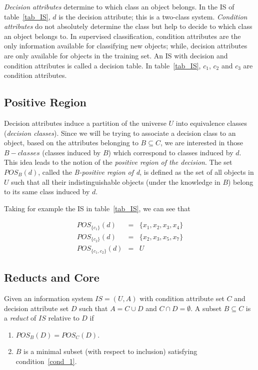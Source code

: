 \documentclass[citenumber]{llncs}
\begin{document}
   
  \textit{Decision attributes} determine to which class an object belongs. In the IS of
  table~\ref{tab_IS}, $d$ is the decision attribute; this is a two-class system. \textit{Condition attributes} 
  do not absolutely determine the class but help to decide to which class an object belongs to. In supervised 
  classification, condition attributes are the only information available for classifying new objects; while, 
  decision attributes are only available for objects in the training set. An IS with decision and 
  condition attributes is called a decision table. In table~\ref{tab_IS}, $c_1$, $c_2$ and $c_3$ are condition 
  attributes.
  
\subsection{Positive Region}\label{subsect_Pos}
  Decision attributes induce a partition of the universe $U$ into equivalence classes 
  (\textit{decision classes}). Since we will be trying to associate a decision class to an object, 
  based on the attributes belonging to $B \subseteq C$, we are interested in those 
  $B-classes$ (classes induced by $B$) which correspond to classes induced by $d$. 
  This idea leads to the notion of the  \textit{positive region of the decision}. The set $POS_B(d)$, 
  called the \textit{B-positive region of d}, is defined as the set of all objects in $U$ such 
  that all their indistinguishable objects (under the knowledge in $B$) belong to its same class induced 
  by $d$.
  
  Taking for example the IS in table~\ref{tab_IS}, we can see that
  
  $$\begin{array}{lcc}
  POS_{\lbrace c_1 \rbrace}(d)     &=& \lbrace x_1,x_2,x_3,x_4 \rbrace\\
  POS_{\lbrace c_2 \rbrace}(d)     &=& \lbrace x_2,x_3,x_5,x_7 \rbrace\\
  POS_{\lbrace c_1, c_2 \rbrace}(d)&=& U
  \end{array}$$
 
\subsection{Reducts and Core}\label{def_reduct}
  Given an information system $IS=(U,A)$ with condition attribute set $C$ and decision attribute set
  $D$ such that $A=C \cup D$ and $C \cap D =\emptyset$. A subset $B \subseteq C$ is a \textit{reduct} 
  of $IS$ relative to $D$ if
  \begin{enumerate}
  	\item $POS_B(D)=POS_C(D)$. \label{cond_1}
  	\item $B$ is a minimal subset (with respect to inclusion) satisfying condition~\ref{cond_1}.\label{cond_2}
  \end{enumerate}
\end{document}
